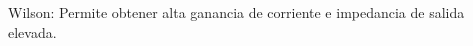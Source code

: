 \documentclass[10pt,landscape]{article}
\makeatletter
\renewcommand{\subsection}{\@startsection{subsection}{2}{0mm}%
                                {-1explus -.5ex minus -.2ex}%
                                {0.5ex plus .2ex}%
                                {\normalfont\normalsize\bfseries}}
\makeatother
\begin{document}
\begin{multicols}{3}
Wilson: Permite obtener alta ganancia de corriente e impedancia de salida elevada.

%
%
%
%


\end{multicols}
\end{document}
